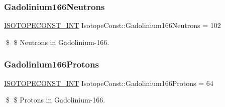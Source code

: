 \subsubsection{\texorpdfstring{Gadolinium166\+Neutrons}{Gadolinium166Neutrons}}
{\footnotesize\ttfamily \mbox{\hyperlink{group___isotope_const-_macros_ga5f18360b3e99483a35c32d789e62621c}{I\+S\+O\+T\+O\+P\+E\+C\+O\+N\+S\+T\+\_\+\+I\+NT}} Isotope\+Const\+::\+Gadolinium166\+Neutrons = 102}

\$ \$ Neutrons in Gadolinium-\/166. \mbox{\label{group___isotope_const-_gadolinium-_gd166_gae1088f4e8207bb47be3f22f57a7540ea}} 
\subsubsection{\texorpdfstring{Gadolinium166\+Protons}{Gadolinium166Protons}}
{\footnotesize\ttfamily \mbox{\hyperlink{group___isotope_const-_macros_ga5f18360b3e99483a35c32d789e62621c}{I\+S\+O\+T\+O\+P\+E\+C\+O\+N\+S\+T\+\_\+\+I\+NT}} Isotope\+Const\+::\+Gadolinium166\+Protons = 64}

\$ \$ Protons in Gadolinium-\/166. 